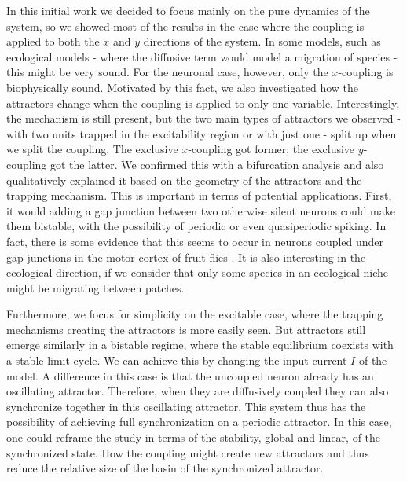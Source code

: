 In this initial work we decided to focus mainly on the pure dynamics of the system, so we showed most of the results in the case where the coupling is applied to both the $x$ and $y$ directions of the system. In some models, such as ecological models - where the diffusive term would model a migration of species - this might be very sound. For the neuronal case, however, only the $x$-coupling is biophysically sound. Motivated by this fact, we also investigated how the attractors change when the coupling is applied to only one variable. Interestingly, the mechanism is still present, but the two main types of attractors we observed - with two units trapped in the excitability region or with just one - split up when we split the coupling. The exclusive $x$-coupling got former; the exclusive $y$-coupling got the latter. We confirmed this with a bifurcation analysis and also qualitatively explained it based on the geometry of the attractors and the trapping mechanism. This is important in terms of potential applications. First, it would adding a gap junction between two otherwise silent neurons could make them bistable, with the possibility of periodic or even quasiperiodic spiking. In fact, there is some evidence that this seems to occur in neurons coupled under gap junctions in the motor cortex of fruit flies \cite{hurkey2023gap}. It is also interesting in the ecological direction, if we consider that only some species in an ecological niche might be migrating between patches.

Furthermore, we focus for simplicity on the excitable case, where the trapping mechanisms creating the attractors is more easily seen. But attractors still emerge similarly in a bistable regime, where the stable equilibrium coexists with a stable limit cycle. We can achieve this by changing the input current $I$ of the model. A difference in this case is that the uncoupled neuron already has an oscillating attractor. Therefore, when they are diffusively coupled they can also synchronize together in this oscillating attractor. This system thus has the possibility of achieving full synchronization on a periodic attractor. In this case, one could reframe the study in terms of the stability, global and linear, of the synchronized state. How the coupling might create new attractors and thus reduce the relative size of the basin of the synchronized attractor.

